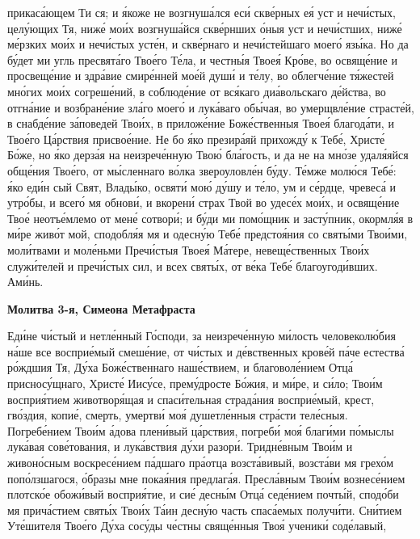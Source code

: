 прикаса́ющем Ти ся; и я́коже не возгнуша́лся еси́ скве́рных ея́ уст и
нечи́стых, целу́ющих Тя, ниже́ мои́х возгнуша́йся скве́рнших о́ныя уст
и нечи́стших, ниже́ ме́рзких мои́х и нечи́стых усте́н, и скве́рнаго и
нечи́стейшаго моего́ язы́ка. Но да бу́дет ми угль пресвята́го Твое́го Те́ла, и
честны́я Твоея́ Кро́ве, во освяще́ние и просвеще́ние и здра́вие смире́нней мое́й
души́ и те́лу, во облегче́ние тя́жестей мно́гих мои́х согреше́ний, в
соблюде́ние от вся́каго диа́вольскаго де́йства, во отгна́ние и возбране́ние
зла́го моего́ и лука́ваго обы́чая, во умерщвле́ние страсте́й, в снабде́ние
за́поведей Твои́х, в приложе́ние Боже́ственныя Твоея́ благода́ти, и Твое́го
Ца́рствия присвое́ние. Не бо я́ко презира́яй прихожду́ к Тебе́, Христе́
Бо́же, но я́ко дерза́я на неизрече́нную Твою́ бла́гость, и да не на мно́зе
удаля́яйся обще́ния Твое́го, от мы́сленнаго во́лка звероуловле́н бу́ду.
Те́мже молю́ся Тебе́: я́ко еди́н сый Свят, Влады́ко, освяти́ мою́ ду́шу и
те́ло, ум и се́рдце, чревеса́ и утро́бы, и всего́ мя обнови́, и вкорени́
страх Твой во удесе́х мои́х, и освяще́ние Твое́ неотъе́млемо от мене́
сотвори́; и бу́ди ми помо́щник и засту́пник, окормля́я в ми́ре живо́т
мой, сподобля́я мя и одесну́ю Тебе́ предстоя́ния со святы́ми Твои́ми,
моли́твами и моле́ньми Пречи́стыя Твоея́ Ма́тере, невеще́ственных Твои́х
служи́телей и пречи́стых сил, и всех святы́х, от ве́ка Тебе́ благоугоди́вших.
Ами́нь.



 

\bfseries Молитва 3-я, Симеона Метафраста\normalfont{}


   Еди́не чи́стый и нетле́нный Го́споди, за неизрече́нную ми́лость
человеколю́бия на́ше все восприе́мый смеше́ние, от чи́стых и де́вственных
крове́й па́че естества́ ро́ждшия Тя, Ду́ха Боже́ственнаго наше́ствием, и
благоволе́нием Отца́ присносу́щнаго, Христе́ Иису́се, прему́дросте Бо́жия, и
ми́ре, и си́ло; Твои́м восприя́тием животворя́щая и спаси́тельная страда́ния
восприе́мый, крест, гво́здия, копие́, смерть, умертви́ моя́ душетле́нныя
стра́сти теле́сныя. Погребе́нием Твои́м а́дова плени́вый ца́рствия, погреби́
моя́ благи́ми по́мыслы лука́вая сове́тования, и лука́вствия ду́хи разори́.
Тридне́вным Твои́м и живоно́сным воскресе́нием па́дшаго пра́отца
возста́вивый, возста́ви мя грехо́м попо́лзшагося, о́бразы мне покая́ния
предлага́я. Пресла́вным Твои́м вознесе́нием плотско́е обожи́вый восприя́тие,
и сие́ десны́м Отца́ седе́нием почты́й, сподо́би мя прича́стием святы́х
Твои́х Та́ин десну́ю часть спаса́емых получи́ти. Сни́тием Уте́шителя
Твое́го Ду́ха сосу́ды че́стны свяще́нныя Твоя́ ученики́ соде́лавый,

